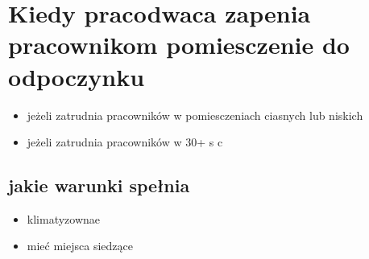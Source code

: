 \documentclass[11pt]{article}
\begin{document}
\section{Kiedy pracodwaca zapenia pracownikom pomiesczenie do odpoczynku}
\label{sec:org1f6f742}
\begin{itemize}
\item jeżeli zatrudnia pracowników w pomiesczeniach ciasnych lub niskich
\item jeżeli zatrudnia pracowników w 30+ s c
\end{itemize}
\subsection{jakie warunki spełnia}
\label{sec:org564bb0a}
\begin{itemize}
\item klimatyzownae
\item mieć miejsca siedzące
\end{itemize}
\end{document}
